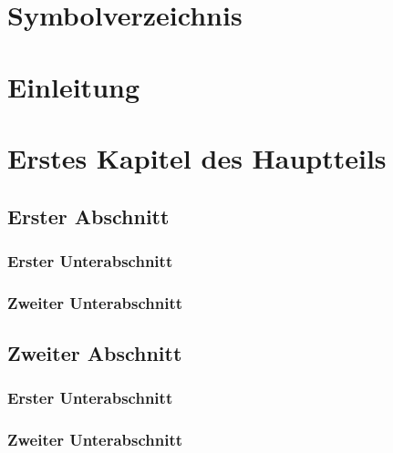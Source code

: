 \documentclass[
  11pt,
  letterpaper,
  DIV=11,
  numbers=noendperiod]{scrartcl}
\numberwithin{equation}{section} %
\begin{document}
\section*{Symbolverzeichnis}
\newpage


\setcounter{page}{1}
\section{Einleitung}
\newpage



\section{Erstes Kapitel des Hauptteils}


\subsection{Erster Abschnitt}

\subsubsection{Erster Unterabschnitt}

\subsubsection{Zweiter Unterabschnitt}

 
\subsection{Zweiter Abschnitt}

\subsubsection{Erster Unterabschnitt}

\subsubsection{Zweiter Unterabschnitt}
\end{document}
